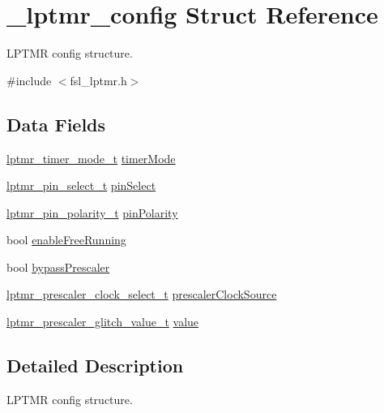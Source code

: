 \hypertarget{struct__lptmr__config}{}\section{\+\_\+lptmr\+\_\+config Struct Reference}
\label{struct__lptmr__config}


L\+P\+T\+MR config structure.  




{\ttfamily \#include $<$fsl\+\_\+lptmr.\+h$>$}

\subsection*{Data Fields}
\begin{DoxyCompactItemize}
\item 
\mbox{\hyperlink{group__lptmr_ga507b12d91dad8bbc571b4d651d3a17c2}{lptmr\+\_\+timer\+\_\+mode\+\_\+t}} \mbox{\hyperlink{struct__lptmr__config_aadb8b183b22fff58a9360a3c2a1c68ff}{timer\+Mode}}
\item 
\mbox{\hyperlink{group__lptmr_ga37c4ca922036c3e0e5af194799d3cfad}{lptmr\+\_\+pin\+\_\+select\+\_\+t}} \mbox{\hyperlink{struct__lptmr__config_a7c71a38b1b8ae8b3b1c967907c42bc96}{pin\+Select}}
\item 
\mbox{\hyperlink{group__lptmr_gaa2ac38a4cb3ac1cfb704baec44f4174c}{lptmr\+\_\+pin\+\_\+polarity\+\_\+t}} \mbox{\hyperlink{struct__lptmr__config_a81e732928dcad4ce95e1fd4c3c801d1f}{pin\+Polarity}}
\item 
bool \mbox{\hyperlink{struct__lptmr__config_a8e4fd702efe3170ad2d4ec0b79cabe3a}{enable\+Free\+Running}}
\item 
bool \mbox{\hyperlink{struct__lptmr__config_aec33382dd1c7d9912c9fd022b68d07c5}{bypass\+Prescaler}}
\item 
\mbox{\hyperlink{group__lptmr_ga63bfd703c032aeb0820e8131c4720cb8}{lptmr\+\_\+prescaler\+\_\+clock\+\_\+select\+\_\+t}} \mbox{\hyperlink{struct__lptmr__config_aca122d02b13f8e68664957cdcef73ceb}{prescaler\+Clock\+Source}}
\item 
\mbox{\hyperlink{group__lptmr_gad3d903364803228c64b5b650c2624ac0}{lptmr\+\_\+prescaler\+\_\+glitch\+\_\+value\+\_\+t}} \mbox{\hyperlink{struct__lptmr__config_a093529e7e6dc5a0d6ed25e66674f9736}{value}}
\end{DoxyCompactItemize}


\subsection{Detailed Description}
L\+P\+T\+MR config structure. 

